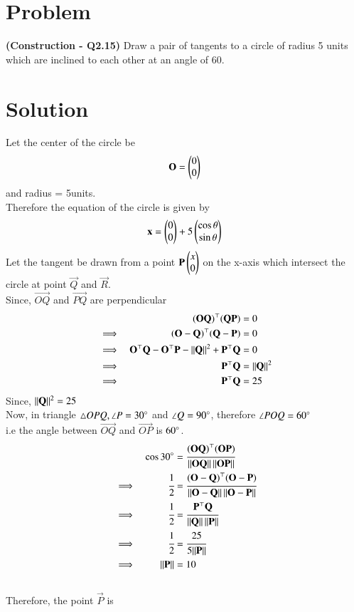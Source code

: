 \documentclass[journal,12pt,twocolumn]{IEEEtran}
\begin{document}
\section*{\textbf{Problem}}
\textbf{(Construction - Q2.15)} Draw a pair of tangents to a circle of radius 5 units which are inclined to each other at an angle of 60\degree.
\section*{\textbf{Solution}}
Let the center of the circle be 
\begin{align}
    \mathbf{O} = \begin{pmatrix}0 \\ 0\end{pmatrix}
\end{align}
and radius = 5units.\\
Therefore the equation of the circle is given by
\begin{align}
    \mathbf{x} = \begin{pmatrix}0 \\ 0\end{pmatrix} + 5\begin{pmatrix}\cos \theta \\ \sin\theta\end{pmatrix}
\end{align}
Let the tangent be drawn from a point $\mathbf{P} \begin{pmatrix}x \\ 0\end{pmatrix}$ on the x-axis which intersect the circle at point $\vec{Q}$ and $\vec{R}$.\\
Since, $\vec{OQ}$ and $\vec{PQ}$ are perpendicular
\begin{align}
    &&\mathbf{(OQ)}^\top \mathbf{(QP)} &= 0\\
    &\implies& \mathbf{(O-Q)}^\top \mathbf{(Q-P)} &= 0\\
    &\implies& \mathbf{O^\top Q} - \mathbf{O^\top P} - \lVert\mathbf{Q}\rVert^2 + \mathbf{P^\top Q} &= 0\\
    &\implies& \mathbf{P^\top Q} &= \lVert\mathbf{Q}\rVert^2\\
    &\implies& \mathbf{P^\top Q} &= 25 \label{0.0.7}
\end{align}
Since, $\lVert\mathbf{Q}\rVert^2 = 25$\\
Now, in triangle $\triangle{OPQ},\angle P = 30\degree$ and $\angle Q = 90\degree$, therefore $\angle{POQ} = 60\degree$ \\
i.e the angle between $\vec{OQ}$ and $\vec{OP}$ is $60\degree$.
\begin{align}
    &&\cos{30\degree} &= \cfrac{\mathbf{(OQ)}^\top \mathbf{(OP)}}{\lVert\mathbf{OQ}\rVert\,\lVert\mathbf{OP}\rVert}\\
    &\implies& \cfrac{1}{2}&= \cfrac{\mathbf{(O-Q)}^\top \mathbf{(O-P)}}{\lVert\mathbf{O-Q}\rVert\,\lVert\mathbf{O-P}\rVert}\\
    &\implies& \cfrac{1}{2}&= \cfrac{\mathbf{P^\top Q}}{\lVert\mathbf{Q}\rVert\, \lVert\mathbf{P}\rVert}\\
    &\implies& \cfrac{1}{2}&= \cfrac{25}{5\lVert\mathbf{P}\rVert}\\
    &\implies& \lVert\mathbf{P}\rVert &= 10
\end{align}\\
Therefore, the point $\vec{P}$ is \\
\end{document}
